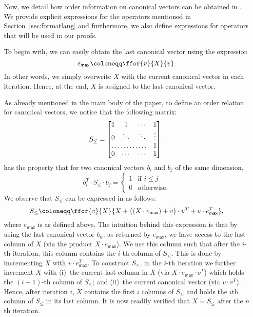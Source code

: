 Now, we detail how order information on canonical vectors can be obtained in \langfor.
We provide explicit expressions for the operators mentioned in Section~\ref{sec:formatlang}
and furthermore, we also define expressions for operators that will be used in our proofs.

To begin with, we can easily obtain the last canonical vector using the expression 
$$
e_{\mathsf{max}} \coloneqq  \ffor{v}{X}{v}.
$$ 
In other words, we simply overwrite $X$ with the current canonical vector in each iteration.
Hence, at the end, $X$ is assigned to the last canonical vector.

%
As already mentioned in the main body of the paper,
to define an order relation for canonical vectors, we notice that the following matrix:
\[
S_{\leq} = \begin{bmatrix}
    1 & 1 & \cdots &  1 \\
    0 & \ddots & \ddots & \vdots \\
    \hdotsfor{3} & 1 \\
    0 & \cdots & \cdots & 1 
\end{bmatrix}.
\]
has the property that for two canonical vectors $b_i$ and $b_j$ of the same dimension, 
$$b_i^T\cdot S_{\leq} \cdot b_j=\begin{cases}1 & \text{if $i\leq j$}\\
0 &\text{otherwise}.
\end{cases}
$$
We observe that $S_{\leq}$ can be expressed in \langfor as 
follows:
$$
S_{\leq}\coloneqq \ffor{v}{X}{X + \bigl((X\cdot e_{\mathsf{max}}) + v \bigr)\cdot v^T + v\cdot e^T_{\mathsf{max}}},
$$
where $e_{\mathsf{max}}$ is as defined above. 
The intuition behind this expression is that by using the last canonical vector $b_n$, as returned by $e_{\mathsf{max}}$, we have access to the last column of $X$ (via the product $X\cdot e_{\mathsf{max}}$). We use this column such that after the $i$-th iteration, this column contains the $i$-th column of $S_{\leq}$. This is done by incrementing $X$ with $v\cdot e_{\mathsf{max}}^T$.
To construct $S_{\leq}$, in the $i$-th iteration we further increment $X$ with 
(i)~the current last column in $X$ (via $X\cdot e_{\mathsf{max}}\cdot v^T$) which holds
the $(i-1)$-th column of $S_{\leq}$; and (ii)~the current canonical vector (via $v\cdot v^T$). Hence, after iteration $i$, $X$ contains the first $i$ columns of $S_{\leq}$ and holds the $i$th column of $S_{\leq}$ in its last column. It is now readily verified that $X=S_{\leq}$ after the $n$th iteration.
%
%

